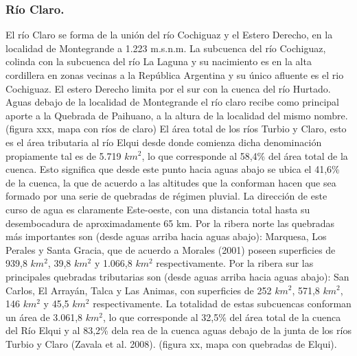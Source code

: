 \documentclass[10pt,]{article}
\begin{document}
\subsubsection{Río Claro.}
El río Claro se forma de la unión del río Cochiguaz y el Estero Derecho, en la localidad de Montegrande a 1.223 m.s.n.m. La subcuenca del río Cochiguaz, colinda con la subcuenca del río La Laguna y su nacimiento es en la alta cordillera en zonas vecinas a la República Argentina y su único afluente es el rio Cochiguaz. El estero Derecho limita por el sur con la cuenca del río Hurtado. Aguas debajo de la localidad de Montegrande el río claro recibe como principal aporte a la Quebrada de Paihuano, a la altura de la localidad del mismo nombre. (figura xxx, mapa con ríos de claro)
El área total de los ríos Turbio y Claro, esto es el área tributaria  al río Elqui desde donde comienza dicha denominación propiamente tal es de 5.719 $km^2$, lo que corresponde al 58,4\% del  área total de la cuenca. Esto significa que desde este punto hacia aguas abajo se ubica el 41,6\% de la cuenca, la que de acuerdo a las altitudes que la conforman hacen que sea formado por una serie de quebradas de régimen pluvial. La dirección de este curso de agua es claramente Este-oeste, con una distancia total hasta su desembocadura de aproximadamente 65 km. Por la ribera norte las quebradas más importantes son (desde aguas arriba hacia aguas abajo): Marquesa, Los Perales y Santa Gracia, que de acuerdo a Morales (2001) poseen superficies de 939,8 $km^2$, 39,8 $km^2$ y 1.066,8 $km^2$ respectivamente. Por la ribera sur las principales quebradas tributarias son (desde aguas arriba hacia aguas abajo): San Carlos, El Arrayán, Talca y Las Animas, con superficies de 252 $km^2$, 571,8 $km^2$, 146 $km^2$ y 45,5 $km^2$ respectivamente. La totalidad de estas subcuencas conforman un área de 3.061,8 $km^2$, lo que corresponde al 32,5\% del área total de la cuenca del Río Elqui y al 83,2\% dela rea de la cuenca aguas debajo de la junta de los ríos Turbio y Claro (Zavala et al. 2008). (figura xx, mapa con quebradas de Elqui).
\end{document}
